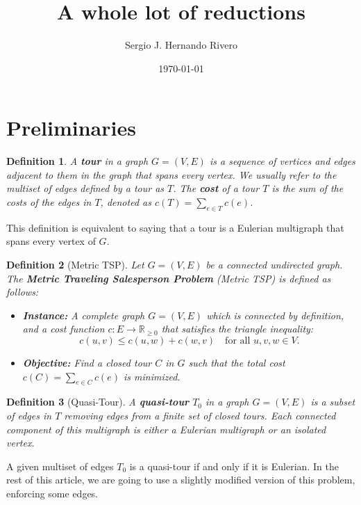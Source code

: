 \documentclass[12pt]{article}
\title{A whole lot of reductions}
\author{Sergio J. Hernando Rivero}
\date{\today}
\newtheorem{definition}{Definition}
\begin{document}
\maketitle

\section{Preliminaries}
\begin{definition}
    A \textbf{tour} in a graph $G = (V, E)$ is a sequence of vertices and edges adjacent to them in the graph that spans every vertex. We usually refer to the multiset of edges defined by a tour as $T$. The \textbf{cost} of a tour $T$ is the sum of the costs of the edges in $T$, denoted as $c(T) = \sum_{e \in T} c(e)$.
\end{definition}
This definition is equivalent to saying that a tour is a Eulerian multigraph that spans every vertex of $G$.
\begin{definition}[Metric TSP]
    Let $G = (V, E)$ be a connected undirected graph. The \textbf{Metric Traveling Salesperson Problem} (Metric TSP) is defined as follows:
    \begin{itemize}
        \item \textbf{Instance:} A complete graph $G = (V, E)$ which is connected by definition, and a cost function $c: E \to \mathbb{R}_{\geq 0}$ that satisfies the triangle inequality:
        \begin{equation}
            c(u, v) \leq c(u, w) + c(w, v) \quad \text{for all } u, v, w \in V.
        \end{equation}
        \item \textbf{Objective:} Find a closed tour $C$ in $G$ such that the total cost $c(C) = \sum_{e \in C} c(e)$ is minimized.
    \end{itemize}
\end{definition}
\begin{definition}[Quasi-Tour]
    A \textbf{quasi-tour} $T_0$ in a graph $G = (V, E)$ is a subset of edges in $T$ removing edges from a finite set of closed tours. 
    Each connected component of this multigraph is either a Eulerian multigraph or an isolated vertex. 
\end{definition}
A given multiset of edges $T_0$ is a quasi-tour if and only if it is Eulerian.
In the rest of this article, we are going to use a slightly modified version of this problem, enforcing some edges. 
\end{document}
